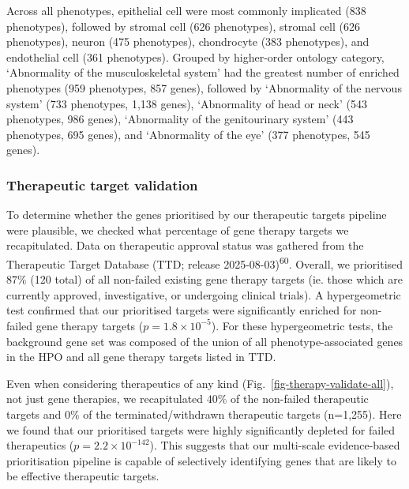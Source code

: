 \documentclass[
]{article}
\begin{document}
Across all phenotypes, epithelial cell were most commonly implicated
(838 phenotypes), followed by stromal cell (626 phenotypes), stromal
cell (626 phenotypes), neuron (475 phenotypes), chondrocyte (383
phenotypes), and endothelial cell (361 phenotypes). Grouped by
higher-order ontology category, `Abnormality of the musculoskeletal
system' had the greatest number of enriched phenotypes (959 phenotypes,
857 genes), followed by `Abnormality of the nervous system' (733
phenotypes, 1,138 genes), `Abnormality of head or neck' (543 phenotypes,
986 genes), `Abnormality of the genitourinary system' (443 phenotypes,
695 genes), and `Abnormality of the eye' (377 phenotypes, 545 genes).

\subsubsection{Therapeutic target
validation}\label{therapeutic-target-validation}

To determine whether the genes prioritised by our therapeutic targets
pipeline were plausible, we checked what percentage of gene therapy
targets we recapitulated. Data on therapeutic approval status was
gathered from the Therapeutic Target Database (TTD; release
2025-08-03)\textsuperscript{60}. Overall, we prioritised \(87\)\% (120
total) of all non-failed existing gene therapy targets (ie. those which
are currently approved, investigative, or undergoing clinical trials). A
hypergeometric test confirmed that our prioritised targets were
significantly enriched for non-failed gene therapy targets
(\(p=\)\(1.8 \times 10^{-5}\)). For these hypergeometric tests, the
background gene set was composed of the union of all
phenotype-associated genes in the HPO and all gene therapy targets
listed in TTD.

Even when considering therapeutics of any kind
(Fig.~\ref{fig-therapy-validate-all}), not just gene therapies, we
recapitulated \(40\)\% of the non-failed therapeutic targets and 0\% of
the terminated/withdrawn therapeutic targets (n=1,255). Here we found
that our prioritised targets were highly significantly depleted for
failed therapeutics (\(p=\)\(2.2 \times 10^{-142}\)). This suggests that
our multi-scale evidence-based prioritisation pipeline is capable of
selectively identifying genes that are likely to be effective
therapeutic targets.
\end{document}
